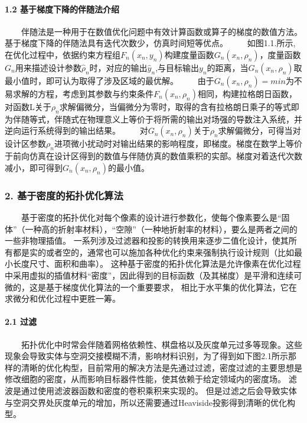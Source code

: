 \documentclass[letterpaper,10pt,english]{sphinxmanual}
\begin{document}
\paragraph{1.2 基于梯度下降的伴随法介绍}
\label{\detokenize{_u7b80_u4ecb/_u6838_u5fc3_u8bbe_u8ba1_u4f18_u5316_u7b97_u6cd5/_u68af_u5ea6_u62d3_u6251_u4f18_u5316_u6a21_u5757/_u68af_u5ea6_u62d3_u6251_u4f18_u5316_u7b97_u6cd5:id4}}
\sphinxAtStartPar
  伴随法是一种用于在数值优化问题中有效计算函数或算子的梯度的数值方法。基于梯度下降的伴随法具有迭代次数少，仿真时间短等优点。
  如图1.1.所示,在优化过程中，依据约束方程组\(F_n(x_n,y_n)\)构建度量函数\(G_n(x_n,ρ_n)\)，度量函数\(G_n\)用来描述设计参数\(\hat{ρ}_n\)时，对应的输出\(\hat{y}_n\),与目标输出\(y_n\)的距离，当\(G_n(x_n,ρ_n)\)取最小值时，即可认为取得了涉及区域的最优解。
  由于\(G_n(x_n,ρ_n)=min\)为不易求解的方程，考虑到其参数与约束条件\(F_n(x_n,ρ_n)\)相同，构建拉格朗日函数，对函数L关于\(ρ_n\)求解偏微分，当偏微分为零时，取得的含有拉格朗日乘子的等式即为伴随等式，伴随式在物理意义上等价于将所需的输出对场强的导数注入系统，并逆向运行系统得到的输出结果。
  对\(G_n(x_n,ρ_n)\)关于\(ρ_n\)求解偏微分，可得当对设计区参数\(ρ_n\)进项微小扰动时对输出结果的影响程度，即梯度。梯度在数学上等价于前向仿真在设计区得到的数值与伴随仿真的数值乘积的实部。梯度对着迭代次数减小，即可得到\(G_n(x_n,ρ_n)\)的最小值。







\subsubsection{2. 基于密度的拓扑优化算法}
\label{\detokenize{_u7b80_u4ecb/_u6838_u5fc3_u8bbe_u8ba1_u4f18_u5316_u7b97_u6cd5/_u68af_u5ea6_u62d3_u6251_u4f18_u5316_u6a21_u5757/_u68af_u5ea6_u62d3_u6251_u4f18_u5316_u7b97_u6cd5:id5}}
\sphinxAtStartPar
  基于密度的拓扑优化对每个像素的设计进行参数化，使每个像素要么是“固体”（一种高的折射率材料），“空隙”（一种地折射率的材料），要么是两者之间的一些非物理插值。
一系列涉及过滤器和投影的转换用来逐步二值化设计，使其所有都是实的或者空的，通常也可以施加各种优化约束来强制执行设计规则（比如最小长度尺寸、面积和曲率）。
这种基于密度的拓扑优化算法是允许像素在优化过程中采用虚拟的插值材料“密度”，因此得到的目标函数（及其梯度）是平滑和连续可微的，这是基于梯度优化算法的一个重要要求，
相比于水平集的优化算法，它在求微分和优化过程中更胜一筹。


\paragraph{2.1 过滤}
\label{\detokenize{_u7b80_u4ecb/_u6838_u5fc3_u8bbe_u8ba1_u4f18_u5316_u7b97_u6cd5/_u68af_u5ea6_u62d3_u6251_u4f18_u5316_u6a21_u5757/_u68af_u5ea6_u62d3_u6251_u4f18_u5316_u7b97_u6cd5:id6}}
\sphinxAtStartPar
  拓扑优化中时常会伴随着网格依赖性、棋盘格以及灰度单元过多等现象。这些现象会导致实体与空洞交接模糊不清，影响材料识别，为了得到如下图2.1所示那样的清晰的优化构型，目前常用的解决方法是先通过过滤，密度过滤的主要思想是修改细胞的密度，从而影响目标器件性能，使其依赖于给定领域内的密度场。
滤波是通过使用滤波器函数和密度的卷积乘积来实现的。
但是过滤之后会导致实体与空洞交界处灰度单元的增加，所以还需要通过Heaviside投影得到清晰的优化构型。
\end{document}
